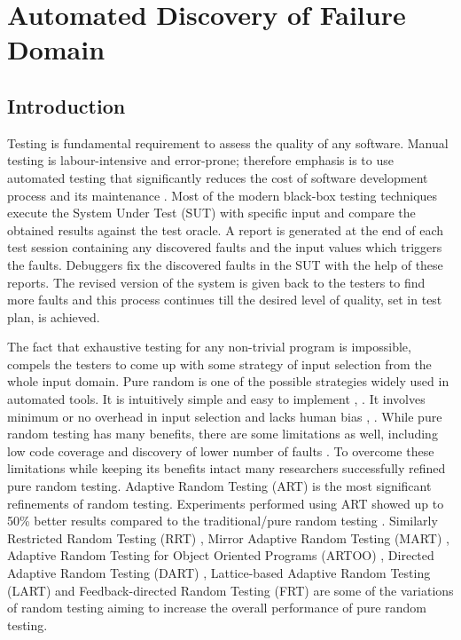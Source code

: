 \chapter{Automated Discovery of Failure Domain}
\label{chap:ADFD}

\section{Introduction}\label{sec:intro4}

Testing is fundamental requirement to assess the quality of any software. Manual testing is labour-intensive and error-prone; therefore emphasis is to use automated testing that significantly reduces the cost of software development process and its maintenance \cite{beizer1995black}. Most of the modern black-box testing techniques execute the System Under Test (SUT) with specific input and compare the obtained results against the test oracle. A report is generated at the end of each test session containing any discovered faults and the input values which triggers the faults. Debuggers fix the discovered faults in the SUT with the help of these reports. The revised version of the system is given back to the testers to find more faults and this process continues till the desired level of quality, set in test plan, is achieved.

The fact that exhaustive testing for any non-trivial program is impossible, compels the testers to come up with some strategy of input selection from the whole input domain. Pure random is one of the possible strategies widely used in automated tools. It is intuitively simple and easy to implement \cite{Ciupa2008},  \cite{Forrester2000}. It involves minimum or no overhead in input selection and lacks human bias \cite{hamlet1994},  \cite{Linger1993}. While pure random testing has many benefits, there are some limitations as well, including low code coverage \cite{Offutt1996} and discovery of lower number of faults \cite{Chen1994}. To overcome these limitations while keeping its benefits intact many researchers successfully refined pure random testing. Adaptive Random Testing (ART) is the most significant refinements of random testing. Experiments performed using ART showed up to 50\% better results compared to the traditional/pure random testing  \cite{Chen2008}.  Similarly Restricted Random Testing (RRT) \cite{Chan2002}, Mirror Adaptive Random Testing (MART)  \cite{Chen2004}, Adaptive Random Testing for Object Oriented Programs (ARTOO) \cite{Ciupa2008}, Directed Adaptive Random Testing (DART)  \cite{Godefroid2005}, Lattice-based Adaptive Random Testing (LART) \cite{Mayer2005} and Feedback-directed Random Testing (FRT) \cite{Pacheco2007} are some of the variations of random testing aiming to increase the overall performance of pure random testing.

